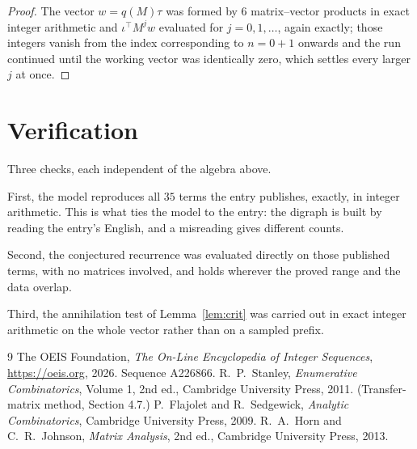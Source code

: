 \documentclass[11pt,a4paper]{article}
\theoremstyle{plain}
\theoremstyle{definition}
\begin{document}
\begin{proof}
The vector $w=q(M)\tau$ was formed by $6$ matrix--vector products in exact integer
arithmetic and $\iota^{\!\top}M^{j}w$ evaluated for $j=0,1,\dots$, again exactly; those
integers vanish from the index corresponding to $n=0+1$ onwards and the run continued
until the working vector was identically zero, which settles every larger $j$ at once.
\end{proof}

\section{Verification}

Three checks, each independent of the algebra above.

First, the model reproduces all $35$ terms the entry publishes, exactly, in integer
arithmetic. This is what ties the model to the entry: the digraph is built by reading the
entry's English, and a misreading gives different counts.

Second, the conjectured recurrence was evaluated directly on those published terms, with no
matrices involved, and holds wherever the proved range and the data overlap.

Third, the annihilation test of Lemma~\ref{lem:crit} was carried out in exact integer
arithmetic on the whole vector rather than on a sampled prefix.

\begin{thebibliography}{9}
 The OEIS Foundation, \emph{The On-Line Encyclopedia of Integer
Sequences}, \url{https://oeis.org}, 2026. Sequence A226866.
 R.~P.~Stanley, \emph{Enumerative Combinatorics}, Volume 1, 2nd ed.,
Cambridge University Press, 2011. (Transfer-matrix method, Section 4.7.)
 P.~Flajolet and R.~Sedgewick, \emph{Analytic Combinatorics}, Cambridge
University Press, 2009.
 R.~A.~Horn and C.~R.~Johnson, \emph{Matrix Analysis}, 2nd ed., Cambridge
University Press, 2013.
\end{thebibliography}
\end{document}
